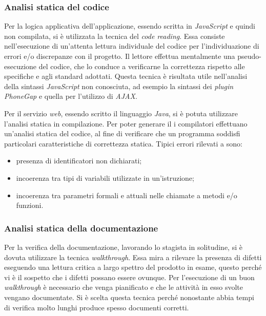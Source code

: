 \subsubsection{Analisi statica del codice}


Per la logica applicativa dell'applicazione, essendo scritta in \textit{JavaScript} e quindi non compilata, si è utilizzata la tecnica del \textit{code reading}. Essa consiste nell'esecuzione di un'attenta lettura individuale del codice per l'individuazione di errori e/o discrepanze con il progetto. Il lettore effettua mentalmente una pseudo-esecuzione del codice, che lo conduce a verificarne la correttezza rispetto alle specifiche e agli standard adottati. Questa tecnica è risultata utile nell'analisi della sintassi \textit{JavaScript} non conosciuta, ad esempio la sintassi dei \textit{plugin PhoneGap} e quella per l'utilizzo di \textit{AJAX}.


Per il servizio \textit{web}, essendo scritto il linguaggio \textit{Java}, si è potuta utilizzare l'analisi statica in compilazione. Per poter generare il  i compilatori effettuano un'analisi statica del codice, al fine di verificare che un programma soddisfi particolari caratteristiche di correttezza statica. Tipici errori rilevati a  sono:
\begin{itemize}
	\item presenza di identificatori non dichiarati;
	\item incoerenza tra tipi di variabili utilizzate in un'istruzione;
	\item incoerenza tra parametri formali e attuali nelle chiamate a metodi e/o funzioni.
\end{itemize}

\subsubsection{Analisi statica della documentazione}

Per la verifica della documentazione, lavorando lo stagista in solitudine, si è dovuta utilizzare la tecnica \textit{walkthrough}. Essa mira a rilevare la presenza di difetti eseguendo una lettura critica a largo spettro del prodotto in esame, questo perché vi è il sospetto che i difetti possano essere ovunque. Per l'esecuzione di un buon \textit{walkthrough} è necessario che venga pianificato e che le attività in esso svolte vengano documentate. Si è scelta questa tecnica perché nonostante abbia tempi di verifica molto lunghi produce spesso documenti corretti.

